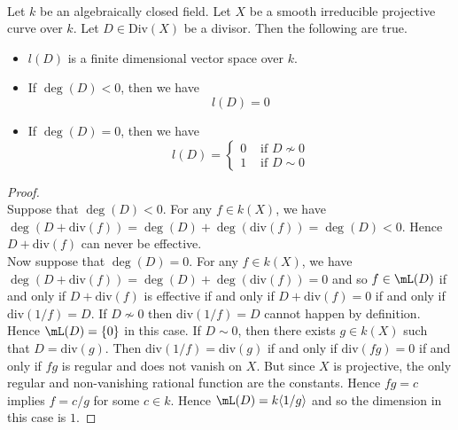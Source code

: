 \documentclass[a4paper]{article}
\begin{document}
\begin{prp}{}{}\\
Let $k$ be an algebraically closed field. Let $X$ be a smooth irreducible projective curve over $k$. Let $D\in\text{Div}(X)$ be a divisor. Then the following are true. 
\begin{itemize}
\item $l(D)$ is a finite dimensional vector space over $k$. 
\item If $\deg(D)<0$, then we have $$l(D)=0$$
\item If $\deg(D)=0$, then we have $$l(D)=\begin{cases}
0 & \text{ if }D\not\sim0\\
1 & \text{ if }D\sim 0
\end{cases}$$
\end{itemize}
\begin{proof}\\
Suppose that $\deg(D)<0$. For any $f\in k(X)$, we have $\deg(D+\text{div}(f))=\deg(D)+\deg(\text{div}(f))=\deg(D)<0$. Hence $D+\text{div}(f)$ can never be effective. \\

Now suppose that $\deg(D)=0$. For any $f\in k(X)$, we have $\deg(D+\text{div}(f))=\deg(D)+\deg(\text{div}(f))=0$ and so $f\in\mL(D)$ if and only if $D+\text{div}(f)$ is effective if and only if $D+\text{div}(f)=0$ if and only if $\text{div}(1/f)=D$. If $D\not\sim0$ then $\text{div}(1/f)=D$ cannot happen by definition. Hence $\mL(D)=\{0\}$ in this case. If $D\sim 0$, then there exists $g\in k(X)$ such that $D=\text{div}(g)$. Then $\text{div}(1/f)=\text{div}(g)$ if and only if $\text{div}(fg)=0$ if and only if $fg$ is regular and does not vanish on $X$. But since $X$ is projective, the only regular and non-vanishing rational function are the constants. Hence $fg=c$ implies $f=c/g$ for some $c\in k$. Hence $\mL(D)=k\langle 1/g\rangle$ and so the dimension in this case is $1$. 
\end{proof}
\end{prp}
\end{document}
